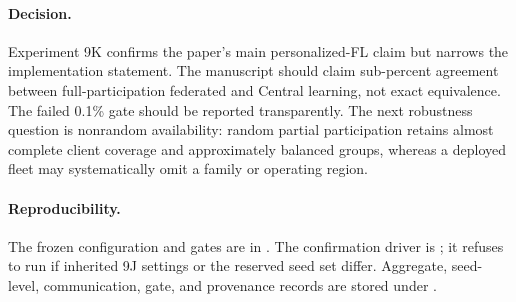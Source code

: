 \paragraph{Decision.}
Experiment 9K confirms the paper's main personalized-FL claim but narrows the
implementation statement. The manuscript should claim sub-percent agreement
between full-participation federated and Central learning, not exact equivalence.
The failed 0.1\% gate should be reported transparently. The next robustness
question is nonrandom availability: random partial participation retains almost
complete client coverage and approximately balanced groups, whereas a deployed
fleet may systematically omit a family or operating region.

\paragraph{Reproducibility.}
The frozen configuration and gates are in
. The confirmation driver is
; it refuses to run
if inherited 9J settings or the reserved seed set differ. Aggregate, seed-level,
communication, gate, and provenance records are stored under
.

